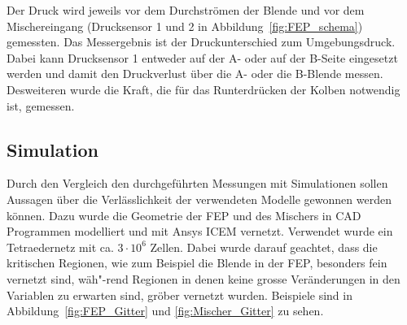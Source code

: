 Der Druck wird jeweils vor dem Durchströmen der Blende und vor dem Mischereingang (Drucksensor 1 und 2 in Abbildung~\ref{fig:FEP_schema}) gemessten. Das Messergebnis ist der Druckunterschied zum Umgebungsdruck.
Dabei kann Drucksensor 1 entweder auf der A- oder auf der B-Seite eingesetzt werden und damit den Druckverlust über die A- oder die B-Blende messen.
Desweiteren wurde die Kraft, die für das Runterdrücken der Kolben notwendig ist, gemessen.
%
\subsection{Simulation}
Durch den Vergleich den durchgeführten Messungen mit Simulationen sollen Aussagen über die Verlässlichkeit der verwendeten Modelle gewonnen werden können.
Dazu wurde die Geometrie der FEP und des Mischers in CAD Programmen modelliert und mit Ansys ICEM vernetzt. Verwendet wurde ein Tetraedernetz mit ca. $3\cdot10^6$ Zellen. Dabei wurde darauf geachtet, dass die kritischen Regionen, wie zum Beispiel die Blende in der FEP, besonders fein vernetzt sind, wäh"-rend Regionen in denen keine grosse Veränderungen in den Variablen zu erwarten sind, gröber vernetzt wurden. Beispiele sind in Abbildung~\ref{fig:FEP_Gitter} und \ref{fig:Mischer_Gitter} zu sehen.


